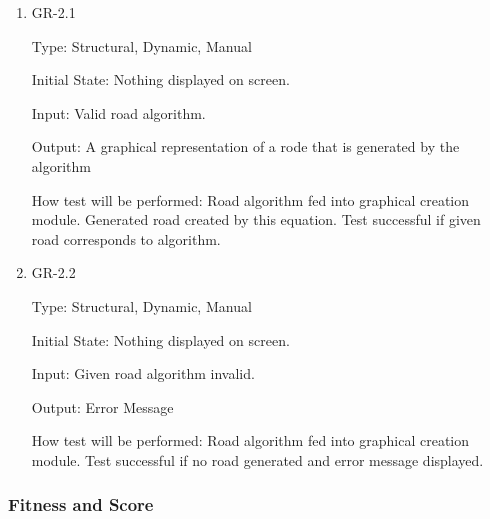 \documentclass[12pt, titlepage]{article}
\begin{document}
\begin{enumerate}
\item{GR-2.1\\}

Type: Structural, Dynamic, Manual
					
Initial State: Nothing displayed on screen.
					
Input:  Valid road algorithm.
					
Output: A graphical representation of a rode that is generated by the algorithm
					
How test will be performed: Road algorithm fed into graphical creation module. 
Generated road created by this equation. Test successful if given road 
corresponds to algorithm.

\item{GR-2.2\\}

Type: Structural, Dynamic, Manual
					
Initial State: Nothing displayed on screen.
					
Input: Given road algorithm invalid.
					
Output: Error Message
					
How test will be performed: Road algorithm fed into graphical creation module. 
Test successful if no road generated and error message displayed.

\end{enumerate}

\subsubsection{Fitness and Score}
\end{document}
